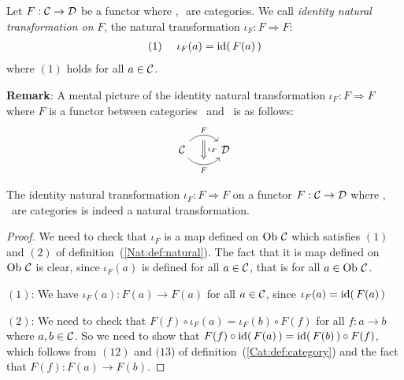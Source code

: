 \begin{defin}\label{Nat:def:identity}
    Let $F:\mbox{$\cal C$}\to\mbox{$\cal D$}$ be a functor where \Cat,\,\Dat\ are categories. 
    We call {\em identity natural transformation on} $F$, the 
    natural transformation $\iota_{F}:F\Rightarrow F$:
        \begin{eqnarray*}
            (1)&\ &\iota_{F}(a)=\mbox{\rm id}(\,F(a)\,)
        \end{eqnarray*}
    where $(1)$ holds for all $a\in\mbox{$\cal C$}$.
\end{defin}

\noindent
{\bf Remark}: A mental picture of the identity natural transformation 
$\iota_{F}:F\Rightarrow F$ where $F$ is a functor between categories \Cat\ 
and \Dat\ is as follows:
    \[
        \begin{tikzcd}
            \Cat \arrow[r, "F", bend left  = 50, ""{name=U, below}]
                 \arrow[r, swap, "F", bend right = 50, ""{name=D, above}]
              & \Dat
            \arrow[Rightarrow, "\,\iota_{F}", from = U, to = D]
        \end{tikzcd}
    \]

\begin{prop}\label{Nat:prop:identity}
    The identity natural transformation $\iota_{F}:F\Rightarrow F$ on a
    functor $F:\mbox{$\cal C$}\to\mbox{$\cal D$}$ where \Cat,\,\Dat\ are categories is indeed
    a natural transformation.
\end{prop}
\begin{proof}
    We need to check that $\iota_{F}$ is a map defined on $\mbox{\rm Ob}\ \mbox{$\cal C$}$
    which satisfies $(1)$ and $(2)$ of definition~(\ref{Nat:def:natural}).
    The fact that it is map defined on $\mbox{\rm Ob}\ \mbox{$\cal C$}$ is clear, since
    $\iota_{F}(a)$ is defined for all $a\in\mbox{$\cal C$}$, that is for all 
    $a\in\mbox{\rm Ob}\ \mbox{$\cal C$}$.

    $(1)$: We have $\iota_{F}(a):F(a)\to F(a)$ for all $a\in\mbox{$\cal C$}$,
    since $\iota_{F}(a)=\mbox{\rm id}(\,F(a)\,)$

    $(2)$: We need to check that $F(f)\circ\iota_{F}(a) = \iota_{F}(b)\circ F(f)$
    for all  $f:a\to b$ where $a,b\in\mbox{$\cal C$}$. So we need to show that
    $F(f)\circ\mbox{\rm id}(\,F(a)\,)=\mbox{\rm id}(\,F(b)\,)\circ F(f)$, which follows
    from $(12)$ and $(13$) of definition~(\ref{Cat:def:category})
    and the fact that $F(f):F(a)\to F(b)$.
\end{proof}
